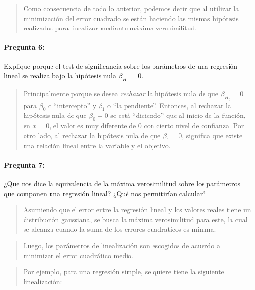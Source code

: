 \documentclass[]{article}
\let\oldparagraph\paragraph
\renewcommand{\paragraph}[1]{\oldparagraph{#1}\mbox{}}
\begin{document}
\begin{quote}
Como consecuencia de todo lo anterior, podemos decir que al utilizar la
minimización del error cuadrado se están haciendo las mismas hipótesis
realizadas para linealizar mediante máxima verosimilitud.
\end{quote}

\hypertarget{pregunta-6}{%
\paragraph{\texorpdfstring{\textbf{Pregunta
6:}}{Pregunta 6:}}\label{pregunta-6}}

Explique porque el test de significancia sobre los parámetros de una
regresión lineal se realiza bajo la hipótesis nula \(\beta_{H_{0}}=0\).

\begin{quote}
Principalmente porque se desea \emph{rechazar} la hipótesis nula de que
\(\beta_{H_{0}}=0\) para \(\beta_0\) o ``intercepto'' y \(\beta_1\) o
``la pendiente''. Entonces, al rechazar la hipótesis nula de que
\(\beta_0 = 0\) se está ``diciendo'' que al inicio de la función, en
\(x=0\), el valor es muy diferente de 0 con cierto nivel de confianza.
Por otro lado, al rechazar la hipótesis nula de que \(\beta_1 = 0\),
significa que existe una relación lineal entre la variable y el
objetivo.
\end{quote}

\hypertarget{pregunta-7}{%
\paragraph{\texorpdfstring{\textbf{Pregunta
7:}}{Pregunta 7:}}\label{pregunta-7}}

¿Que nos dice la equivalencia de la máxima verosimilitud sobre los
parámetros que componen una regresión lineal? ¿Qué nos permitirían
calcular?

\begin{quote}
Asumiendo que el error entre la regresión lineal y los valores reales
tiene un distribución gaussiana, se busca la máxima verosimilitud para
este, la cual se alcanza cuando la suma de los errores cuadraticos es
mínima.
\end{quote}

\begin{quote}
Luego, los parámetros de linealización son escogidos de acuerdo a
minimizar el error cuadrático medio.
\end{quote}

\begin{quote}
Por ejemplo, para una regresión simple, se quiere tiene la siguiente
linealización:
\end{quote}
\end{document}

